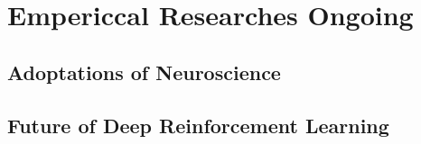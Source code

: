 %
%
%
\chapter{Empericcal Researches Ongoing}
\label{intro} %
\section{Adoptations of Neuroscience}
\section{Future of Deep Reinforcement Learning}



